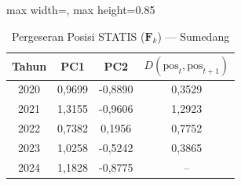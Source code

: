 \begin{table}[H]
\centering
\caption{Pergeseran Posisi STATIS ($\mathbf{F}_k$) --- Sumedang} \label{tab:app2jarak_statis_skor_sumedang}
\begin{adjustbox}{max width=\textwidth, max height=0.85\textheight}
\begin{tabular}{|c|c|c|c|}
\hline
\textbf{Tahun} & \textbf{PC1} & \textbf{PC2} & \textbf{$D(\text{pos}_t, \text{pos}_{t+1})$} \\
\hline
2020 & 0,9699 & -0,8890 & 0,3529 \\
2021 & 1,3155 & -0,9606 & 1,2923 \\
2022 & 0,7382 & 0,1956 & 0,7752 \\
2023 & 1,0258 & -0,5242 & 0,3865 \\
2024 & 1,1828 & -0,8775 & -- \\
\hline
\end{tabular}
\end{adjustbox}
\end{table}